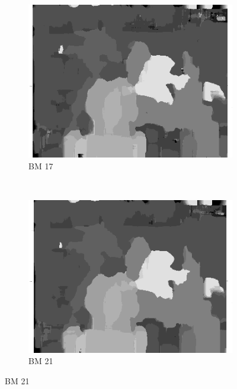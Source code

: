 \begin{figure}
\begin{subfigure}[b]{0.23\textwidth}
    \includegraphics[width=\textwidth]{images/stereo-pairs/tsukuba_bm_17.png}
    \caption{BM 17}
  \end{subfigure}
  ~
  \begin{subfigure}[b]{0.23\textwidth}
    \centering
    \includegraphics[width=\textwidth]{images/stereo-pairs/tsukuba_bm_21.png}
    \caption{BM 21}
  \end{subfigure}


\end{figure}
